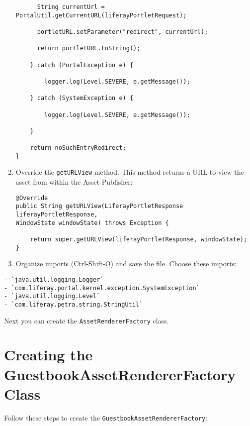 \begin{enumerate}
\begin{verbatim}
      String currentUrl = PortalUtil.getCurrentURL(liferayPortletRequest);

      portletURL.setParameter("redirect", currentUrl);

      return portletURL.toString();

    } catch (PortalException e) {

        logger.log(Level.SEVERE, e.getMessage());

    } catch (SystemException e) {

        logger.log(Level.SEVERE, e.getMessage());

    }

    return noSuchEntryRedirect;
}
\end{verbatim}
\item
  Override the \texttt{getURLView} method. This method returns a URL to
  view the asset from within the Asset Publisher:

\begin{verbatim}
@Override
public String getURLView(LiferayPortletResponse liferayPortletResponse, 
WindowState windowState) throws Exception {

    return super.getURLView(liferayPortletResponse, windowState);
}
\end{verbatim}
\item
  Organize imports (Ctrl-Shift-O) and save the file. Choose these
  imports:
\end{enumerate}

\begin{verbatim}
- `java.util.logging.Logger` 
- `com.liferay.portal.kernel.exception.SystemException` 
- `java.util.logging.Level` 
- `com.liferay.petra.string.StringUtil`
\end{verbatim}

Next you can create the \texttt{AssetRendererFactory} class.

\section{Creating the GuestbookAssetRendererFactory
Class}\label{creating-the-guestbookassetrendererfactory-class}

Follow these steps to create the \texttt{GuestbookAssetRendererFactory}:

